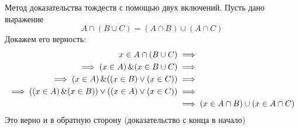 \medskip

Метод доказательства тождеств с помощью двух включений. Пусть дано выражение \[
A \cap (B \cup C) = (A \cap B) \cup (A \cap C)
\]
Докажем его верность:
\begin{align*}
	x \in A \cap (B \cup C) &\implies \\
	\implies (x \in A)\operatorname{\&} (x \in B \cup C) &\implies \\
	\implies (x \in A)\operatorname{\&} ((x \in B)\lor(x \in C)) &\implies \\
	\implies ((x \in A)\operatorname{\&}(x \in B))\lor((x \in A)\lor(x \in C)) &\implies \\
								       &\implies (x \in A \cap B) \cup (x \in A \cap C)
\end{align*}
Это верно и в обратную сторону (доказательство с конца в начало)


